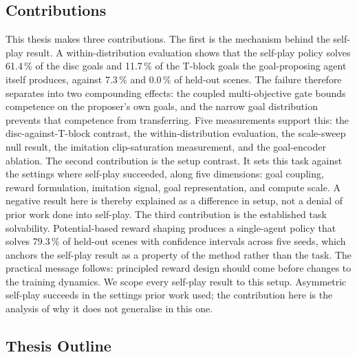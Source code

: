 \subsection{Contributions}

This thesis makes three contributions. The first is the
mechanism behind the self-play result. A within-distribution evaluation shows
that the self-play policy solves 61.4\,\% of the disc goals and 11.7\,\% of the
T-block goals the goal-proposing agent itself produces, against 7.3\,\% and
0.0\,\% of held-out scenes. The failure therefore separates into two compounding
effects: the coupled multi-objective gate bounds competence on the proposer's
own goals, and the narrow goal distribution prevents that competence from
transferring. Five measurements support this: the disc-against-T-block contrast,
the within-distribution evaluation, the scale-sweep null result, the imitation
clip-saturation measurement, and the goal-encoder ablation. The second
contribution is the setup contrast. It sets this task against the settings where self-play
succeeded, along five dimensions: goal coupling, reward formulation, imitation signal,
goal representation, and compute scale. A negative result here is thereby
explained as a difference in setup, not a denial of prior work done into self-play. The third
contribution is the established task solvability. Potential-based reward shaping
produces a single-agent policy that solves 79.3\,\% of held-out scenes with
confidence intervals across five seeds, which anchors the self-play result as a
property of the method rather than the task. The practical message follows:
principled reward design should come before changes to the training dynamics. We
scope every self-play result to this setup. Asymmetric self-play succeeds in the
settings prior work used; the contribution here is the analysis of why it does
not generalise in this one.

\subsection{Thesis Outline}


